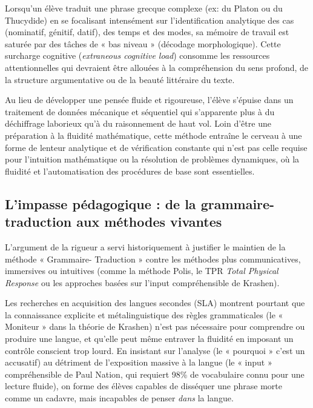 Lorsqu'un élève traduit une phrase grecque complexe (ex: du Platon ou du Thucydide) en se focalisant
intensément sur l'identification analytique des cas (nominatif, génitif, datif), des temps et des
modes, sa mémoire de travail est saturée par des tâches de « bas niveau » (décodage morphologique).
Cette surcharge cognitive (\textit{extraneous cognitive load}) consomme les ressources
attentionnelles qui devraient être allouées à la compréhension du sens profond, de la structure
argumentative ou de la beauté littéraire du texte.\cite{II-1-2-ref47}

Au lieu de développer une pensée fluide et rigoureuse, l'élève s'épuise dans un traitement de
données mécanique et séquentiel qui s'apparente plus à du déchiffrage laborieux qu'à du raisonnement
de haut vol.\cite{II-1-2-ref15} Loin d'être une préparation à la fluidité mathématique, cette
méthode entraîne le cerveau à une forme de lenteur analytique et de vérification constante qui n'est
pas celle requise pour l'intuition mathématique ou la résolution de problèmes dynamiques, où la
fluidité et l'automatisation des procédures de base sont essentielles.\cite{II-1-2-ref48}



\subsection{L'impasse pédagogique : de la grammaire-traduction aux méthodes vivantes}

L'argument de la rigueur a servi historiquement à justifier le maintien de la méthode « Grammaire-
Traduction » contre les méthodes plus communicatives, immersives ou intuitives (comme la méthode
Polis, le TPR \- \textit{Total Physical Response} ou les approches basées sur l'input compréhensible
de Krashen).\cite{II-1-2-ref50}

Les recherches en acquisition des langues secondes (SLA) montrent pourtant que la connaissance
explicite et métalinguistique des règles grammaticales (le « Moniteur » dans la théorie de Krashen)
n'est pas nécessaire pour comprendre ou produire une langue, et qu'elle peut même entraver la
fluidité en imposant un contrôle conscient trop lourd.\cite{II-1-2-ref53} En insistant sur l'analyse
(le « pourquoi » c'est un accusatif) au détriment de l'exposition massive à la langue (le « input »
compréhensible de Paul Nation, qui requiert 98\% de vocabulaire connu pour une lecture fluide), on
forme des élèves capables de disséquer une phrase morte comme un cadavre, mais incapables de penser
\textit{dans} la langue.\cite{II-1-2-ref55}

